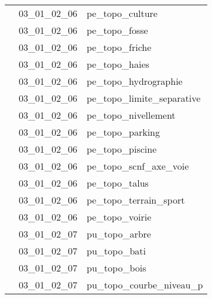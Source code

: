 \documentclass[12pt,titlepage,oneside]{book}
\begin{document}
\begin{supertabular}{|p{10cm}|c|p{15cm}|}
                    & 03\_01\_02\_06 & pe\_topo\_culture\\


                    & 03\_01\_02\_06 & pe\_topo\_fosse\\


                    & 03\_01\_02\_06 & pe\_topo\_friche\\


                    & 03\_01\_02\_06 & pe\_topo\_haies\\


                    & 03\_01\_02\_06 & pe\_topo\_hydrographie\\


                    & 03\_01\_02\_06 & pe\_topo\_limite\_separative\\


                    & 03\_01\_02\_06 & pe\_topo\_nivellement\\


                    & 03\_01\_02\_06 & pe\_topo\_parking\\


                    & 03\_01\_02\_06 & pe\_topo\_piscine\\


                    & 03\_01\_02\_06 & pe\_topo\_scnf\_axe\_voie\\


                    & 03\_01\_02\_06 & pe\_topo\_talus\\


                    & 03\_01\_02\_06 & pe\_topo\_terrain\_sport\\


                    & 03\_01\_02\_06 & pe\_topo\_voirie\\


                    & 03\_01\_02\_07 & pu\_topo\_arbre\\


                    & 03\_01\_02\_07 & pu\_topo\_bati\\


                    & 03\_01\_02\_07 & pu\_topo\_bois\\


                    & 03\_01\_02\_07 & pu\_topo\_courbe\_niveau\_p\\



\end{supertabular}
\end{document}
